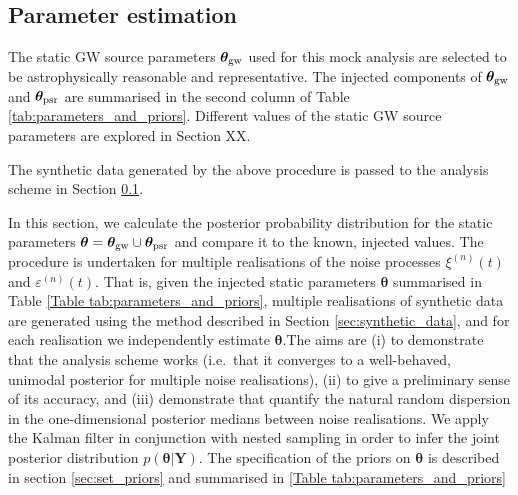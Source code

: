 \documentclass[fleqn,usenatbib,useAMS]{mnras}
\begin{document}
\subsection{Parameter estimation} \label{sec:pe_and_ms} 


The static GW source parameters $\boldsymbol{\theta}_{\rm gw}$ used for this mock analysis are selected to be astrophysically reasonable and representative. The injected components of $\boldsymbol{\theta}_{\rm gw}$ and $\boldsymbol{\theta}_{\rm psr}$ are summarised in the second column of Table \ref{tab:parameters_and_priors}. Different values of the static GW source parameters are explored in Section XX. \newline 

The synthetic data generated by the above procedure is passed to the analysis scheme in Section \ref{sec:pe_and_ms}.








In this section, we calculate the posterior probability distribution for the static parameters $\boldsymbol{\theta} = \boldsymbol{\theta}_{\rm gw} \cup \boldsymbol{\theta}_{\rm psr}$ and compare it to the known, injected values. The procedure is undertaken for multiple realisations of the noise processes $\xi^{(n)}(t)$ and $\varepsilon^{(n)}(t)$. That is, given the injected static parameters $\boldsymbol{\theta}$ summarised in Table \ref{Table tab:parameters_and_priors}, multiple realisations of synthetic data are generated using the method described in Section \ref{sec:synthetic_data}, and for each realisation we independently estimate $\boldsymbol{\theta}$.The aims are (i) to demonstrate that the analysis scheme works (i.e.\ that it converges to a well-behaved, unimodal posterior for multiple noise realisations), (ii) to give a preliminary sense of its accuracy, and (iii) demonstrate that quantify the natural random dispersion in the one-dimensional posterior medians between noise realisations. We apply the Kalman filter in conjunction with nested sampling in order to infer the joint posterior distribution $p({\boldsymbol{\theta}} | {\boldsymbol{Y}})$. The specification of the priors on $\boldsymbol{\theta}$ is described in section \ref{sec:set_priors} and summarised in \ref{Table tab:parameters_and_priors}

	
	
\end{document}
